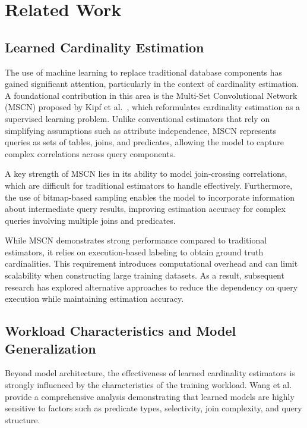 \chapter{Related Work}
\label{chap:relatedwork}
\pagestyle{plain}

\section{Learned Cardinality Estimation}

The use of machine learning to replace traditional database components has gained significant attention, particularly in the context of cardinality estimation. A foundational contribution in this area is the Multi-Set Convolutional Network (MSCN) proposed by Kipf et al.~\cite{DBLP:conf/cidr/KipfKRLBK19}, which reformulates cardinality estimation as a supervised learning problem. Unlike conventional estimators that rely on simplifying assumptions such as attribute independence, MSCN represents queries as sets of tables, joins, and predicates, allowing the model to capture complex correlations across query components.

A key strength of MSCN lies in its ability to model join-crossing correlations, which are difficult for traditional estimators to handle effectively. Furthermore, the use of bitmap-based sampling enables the model to incorporate information about intermediate query results, improving estimation accuracy for complex queries involving multiple joins and predicates.

While MSCN demonstrates strong performance compared to traditional estimators, it relies on execution-based labeling to obtain ground truth cardinalities. This requirement introduces computational overhead and can limit scalability when constructing large training datasets. As a result, subsequent research has explored alternative approaches to reduce the dependency on query execution while maintaining estimation accuracy.

\section{Workload Characteristics and Model Generalization}

Beyond model architecture, the effectiveness of learned cardinality estimators is strongly influenced by the characteristics of the training workload. Wang et al.~\cite{DBLP:journals/pvldb/WangQWWZ21} provide a comprehensive analysis demonstrating that learned models are highly sensitive to factors such as predicate types, selectivity, join complexity, and query structure.


